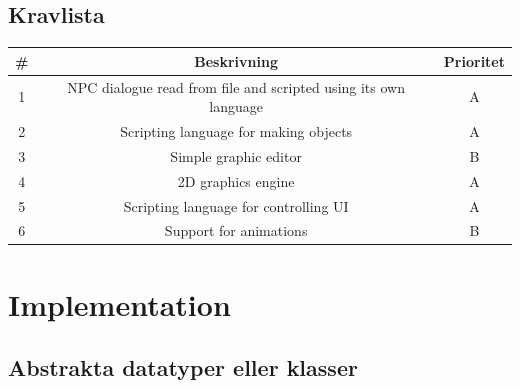 \documentclass[12pt,a4paper]{article}
\begin{document}
\subsection{Kravlista}

\bigskip

\begin{tabular}{|c|c|c|}
\hline
\# & \textbf{Beskrivning} & \textbf{Prioritet} \\ \hline
1 & NPC dialogue read from file and scripted using its own language & A \\ \hline
2 & Scripting language for making objects & A \\ \hline
3 & Simple graphic editor & B \\ \hline
4 & 2D graphics engine & A \\ \hline
5 & Scripting language for controlling UI & A \\ \hline
6 & Support for animations & B \\ \hline
\end{tabular}

\bigskip

\section{Implementation}

\subsection{Abstrakta datatyper eller klasser}
\end{document}
